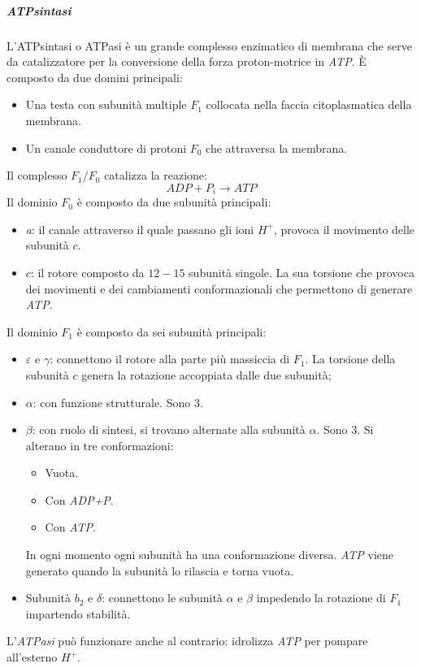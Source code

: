 					\subparagraph{\emph{ATPsintasi}}
					L'ATPsintasi o ATPasi \`e un grande complesso enzimatico di membrana che serve da catalizzatore per la conversione della forza proton-motrice in \emph{ATP}.
					\`E composto da due domini principali:
					\begin{multicols}{2}
						\begin{itemize}
							\item Una testa con subunit\`a multiple $F_1$ collocata nella faccia citoplasmatica della membrana.
							\item Un canale conduttore di protoni $F_0$ che attraversa la membrana. 
						\end{itemize}
					\end{multicols}
					Il complesso $F_1/F_0$ catalizza la reazione:
					\[ADP+P_i \rightarrow ATP\]
					Il dominio $F_0$ \`e composto da due subunit\`a principali:
					\begin{multicols}{2}
						\begin{itemize}
		    					\item \emph{a}: il canale attraverso il quale passano gli ioni \emph{$H^{+}$}, provoca il movimento delle subunit\`a $c$.
		    					\item $c$: il rotore composto da $12-15$ subunit\`a singole. 
								La sua torsione che provoca dei movimenti e dei cambiamenti conformazionali che permettono di generare \emph{ATP}.
						\end{itemize}
					\end{multicols}
					Il dominio $F_1$ \`e composto da sei subunit\`a principali:
					\begin{multicols}{2}
						\begin{itemize}
							\item $\varepsilon$ e $\gamma$: connettono il rotore alla parte pi\`u massiccia di $F_1$. 
								La torsione della subunit\`a $c$ genera la rotazione accoppiata dalle due subunit\`a;
							\item $\alpha$: con funzione strutturale.
								Sono $3$.
							\item $\beta$: con ruolo di sintesi, si trovano alternate alla subunit\`a $\alpha$.
								Sono $3$.
								Si alterano in tre conformazioni:
								\begin{itemize}
									\item Vuota.
									\item Con \emph{ADP+P}.
									\item Con \emph{ATP}.
								\end{itemize}
								In ogni momento ogni subunit\`a ha una conformazione diversa.
								\emph{ATP} viene generato quando la subunit\`a lo rilascia e torna vuota.
							\item Subunit\`a $b_2$ e $\delta$: connettono le subunit\`a $\alpha$ e $\beta$ impedendo la rotazione di $F_1$ impartendo stabilit\`a.
						\end{itemize}
					\end{multicols}
					L'\emph{ATPasi} pu\`o funzionare anche al contrario: idrolizza \emph{ATP} per pompare all'esterno \emph{$H^+$}.

